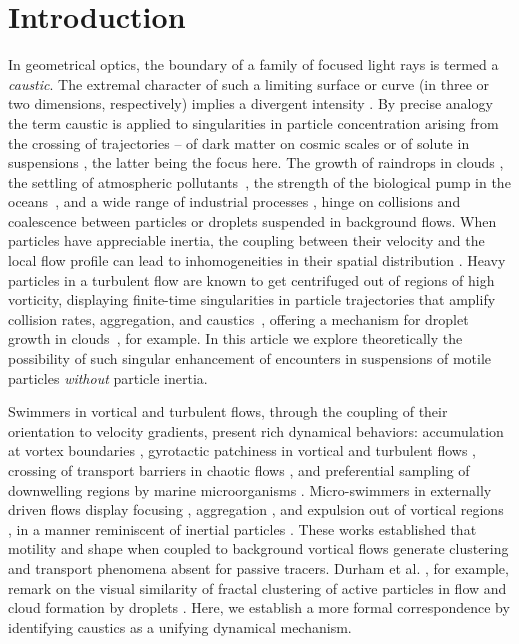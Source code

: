 \documentclass[../Rajarshi-thesis-draft.tex]{subfiles}
\begin{document}
\section{Introduction}
In geometrical optics, the boundary of a family of focused light rays is termed a \textit{caustic}. The extremal character of such a limiting surface or curve (in three or two dimensions, respectively) implies a divergent intensity \cite{Berry1977}. By precise analogy the term caustic is applied to singularities in particle concentration arising from the crossing of trajectories -- of dark matter on cosmic scales \cite{Feldbrugge2018} or of solute in suspensions \cite{Wilkinson_2005}, the latter being the focus here. The growth of raindrops in clouds \cite{PINSKY19971177}, the settling of atmospheric pollutants~\cite{Fernando2010}, the strength of the biological pump in the oceans~\cite{Boyd}, and a wide range of industrial processes \cite{SAMBORSKA2022110960}, hinge on collisions and coalescence between particles or droplets suspended in background flows. When particles have appreciable inertia, the coupling between their velocity and the local flow profile can lead to inhomogeneities in their spatial distribution \cite{Lillo2004}. Heavy particles in a turbulent flow are known to get centrifuged out of regions of high vorticity, displaying finite-time singularities in particle trajectories that amplify collision rates, aggregation, and caustics~\cite{MR1983, Maxey1986, Croor2015, Wilkinson_2005}, offering a mechanism for droplet growth in clouds~\cite{falkovich2002, Croor2017}, for example. In this article we explore theoretically the possibility of such singular enhancement of encounters in suspensions of motile particles \cite{lauga2009hydrodynamics} {\it without} particle inertia. 


Swimmers in vortical and turbulent flows, through the coupling of their orientation to velocity gradients, present rich dynamical behaviors: accumulation at vortex boundaries \cite{Torney2007}, gyrotactic patchiness in vortical and turbulent flows \cite{Durham2011, Durham2013, Zhan2014}, crossing of transport barriers in chaotic flows \cite{Khurana2011}, and preferential sampling of downwelling regions by marine microorganisms \cite{pedley1992hydrodynamic, Durham2013, PhysRevLett.116.108104}. Micro-swimmers in externally driven flows display focusing \cite{Kessler1985}, aggregation \cite{GENIN20043, Ardekani2012}, and expulsion out of vortical regions \cite{Sokolov2016}, in a manner reminiscent of inertial particles \cite{Croor2015, Wilkinson_2005}. These works established that motility and shape when coupled to background vortical flows generate clustering and transport phenomena absent for passive tracers. Durham et al. \cite{Durham2013}, for example, remark on the visual similarity of fractal clustering of active particles in flow and cloud formation by droplets \cite{falkovich2002}. Here, we establish a more formal correspondence by identifying caustics as a unifying dynamical mechanism.
\end{document}
